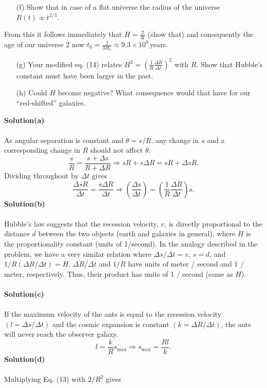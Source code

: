\documentclass[12pt,a4paper]{article}
\begin{document}
\begin{enumerate}
    \item[(f)]Show that in case of a flat universe the radius of the universe $R(t)\propto t^{2/3}$. 
\end{enumerate}
From this it follows immediately that $H=\frac{2}{3t}$ (show that) and consequently the age of our universe 2 now $t_0=\frac{2}{3H_0}\approx9.3\times10^9$\,years.
\begin{enumerate}
    \item[(g)]Your modified eq. (14) relates $H^2=\left(\frac{1}{R}\frac{\Delta R}{\Delta t}\right)^2$ with $R$. Show that Hubble’s constant must have been larger in the past.
    \item[(h)]Could $H$ become negative? What consequence would that have for our “red-shifted” galaxies.
\end{enumerate}
\textbf{Solution(a)}
\\
\\As angular separation is constant and $\theta=s/R$, any change in $s$ and a corresponding change in $R$ should not affect $\theta$.
\[\frac{s}{R}=\frac{s+\Delta s}{R+\Delta R}\Rightarrow sR+s\Delta R=sR+\Delta sR.\]
Dividing throughout by $\Delta t$ gives
\[\frac{\Delta sR}{\Delta t}=\frac{s\Delta R}{\Delta t}\Rightarrow\left(\frac{\Delta s}{\Delta t}\right)=\left(\frac{1}{R}\frac{\Delta R}{\Delta t}\right)s.\]
\textbf{Solution(b)}
\\
\\Hubble's law suggests that the recession velocity, $v$, is directly proportional to the distance $d$ between the two objects (earth and galaxies in general), where $H$ is the proportionality constant (units of 1/second). In the analogy described in the problem, we have a very similar relation where $\Delta s/\Delta t=v$, $s=d$, and $1/R(\Delta R/\Delta t)=H$. $\Delta R/\Delta t$ and $1/R$ have units of meter / second and 1 / meter, respectively. Thus, their product has units of 1 / second (same as $H$).
\\
\\\textbf{Solution(c)}
\\
\\If the maximum velocity of the ants is equal to the recession velocity $(l=\Delta s/\Delta t)$ and the cosmic expansion is constant $(k=\Delta R/\Delta t)$, the ants will never reach the observer galaxy. 
\[l=\frac{k}{R}s_{\text{max}}\Rightarrow s_{\text{max}}=\frac{Rl}{k}.\]
\textbf{Solution(d)}
\\
\\Multiplying Eq. (13) with $2/R^2$ gives
\end{document}
